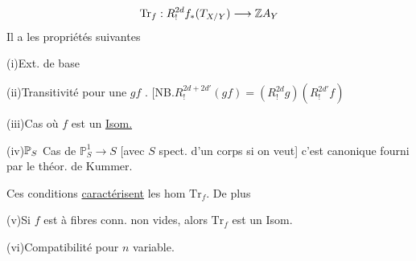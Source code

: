 \[
\mathrm{Tr}_f:R^{2d}_!f_*(T_{X/Y})\longrightarrow
{\mathbb Z}{A}_Y
\]
Il a les propriétés suivantes

(i)\quad Ext. de base

(ii)\quad Transitivité pour une 
 $gf$ .
[NB.\quad $R^{2d+2d'}_!(gf)=(R^{2d}_!g)(R^{2d'}_!f)$

(iii)\quad Cas où $f$ est un \uline{Isom.}

(iv)\quad ${{\mathbb P}_S}$ Cas de $\mathbb P^1_S\longrightarrow S$
[avec $S$ spect. d'un corps si on veut] c'est
canonique fourni par le théor. de Kummer.

Ces conditions \uline{caractérisent} les hom $\mathrm{Tr}_f$.
De plus

(v)\quad Si $f$ est à fibres conn. non vides, alors $\mathrm{Tr}_f$
est un Isom.

(vi)\quad Compatibilité pour $n$ variable.

